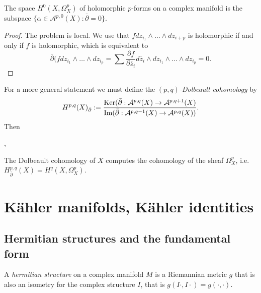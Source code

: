 \begin{proposition}
\label{proposition-dolbeault-proposition}
\begin{reference}
\cite[Proposition 2.6.11]{huc}
\end{reference}
The space $H^0(X,\Omega^p_X)$ of holomorphic
$p$-forms on a complex manifold is the
subspace
$\{\alpha \in
\mathcal{A}^{p,0}(X):\bar\partial=0\}$.
\end{proposition}

\begin{proof}
The problem is local.
We use that $f dz_{i_1}\wedge…\wedge
dz_{i+p}$ is holomorphic
if and only if $f$ is holomorphic, which is
equivalent to
$$
\bar\partial(fdz_{i_1}\wedge…\wedge dz_{i_p}
=\sum \frac{\partial f}{\partial
\overline{z}_i}d\overline{z}_i
\wedge dz_{i_1}\wedge…\wedge dz_{i_p}=0.
$$
\end{proof}

\noindent
For a more general statement we must define
the {\it $(p,q)$-Dolbeault cohomology} by
 $$
H^{p,q}(X)_{\bar\partial}
:=\frac{\mathop{\mathrm{Ker}}
(\bar\partial:\mathcal{A}^{p,q}(X) \to
\mathcal{A}^{p,q+1}(X)}
{\text{Im}(\bar\partial:\mathcal{A}^{p,q-1}
(X)
\to \mathcal{A}^{p,q}(X))}.
$$
Then

\begin{theorem}[Dolbeault]
\label{theorem-dolbeault}
\begin{reference}
\cite[Corollary 2.6.21]{huc}, \cite[Theorem
4.2]{voi}
\end{reference}
The Dolbeault cohomology of $X$ computes the
cohomology
of the sheaf $\Omega^p_X$, i.e.
$H^{p,q}_{\bar\partial}(X)=H^q(X,\Omega^p_X)
$.
\end{theorem}



\section{Kähler manifolds, Kähler identities}
\label{section-kahler}


\subsection{Hermitian structures and the
fundamental
form}
\label{subsection-hermitian-structures}

\begin{definition}
\label{definition-hermitian-structure}
A {\it hermitian structure} on a complex
manifold $M$
is a Riemannian metric $g$ that is also an
isometry for
the complex structure $I$, that is
$g(I\cdot,I\cdot)=g(\cdot,\cdot)$.
\end{definition}

